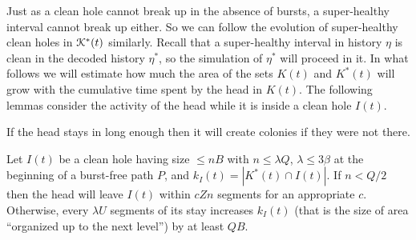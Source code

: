 \documentclass[11pt]{memoir}
\theoremstyle{definition} %
\renewcommand{\le}{\leq}
\def\B{B}
\def\U{U}
\newcommand{\Q}{Q}
\newcommand{\Z}{Z}
\begin{document}
Just as a clean hole cannot break up in the absence of bursts, a super-healthy
interval cannot break up either.
So we can follow the evolution of super-healthy clean holes in \( \mathcal{K}^{*}(t) \) similarly.
Recall that a super-healthy interval in history \( \eta \) is clean in the decoded history \( \eta^{*} \),
so the simulation of \( \eta^{*} \) will proceed in it.
In what follows we will estimate how much the area of the sets \( K(t) \) and \( K^{*}(t) \)
will grow with the cumulative time spent by the head in \( K(t) \).
The following lemmas consider the activity of the head while it is inside a clean hole \( I(t) \).

If the head stays in long enough then it will create colonies if they were not there.

\begin{lemma}\label{lem:inside-hole}
  Let \( I(t) \) be a clean hole having size \( \le n\B \) with \( n\le\lambda\Q \), \( \lambda\le 3\beta \) at the
  beginning of a burst-free path \( P \),
  and \( k_{I}(t)=|K^{*}(t)\cap I(t)| \).
  If \( n<\Q/2 \) then the head will leave \( I(t) \) within \( c\Z n \)
  segments for an appropriate \( c \).
  Otherwise, every \( \lambda\U \) segments of its stay increases
  \( k_{I}(t) \) (that is the size of area ``organized up to the next level'') by at least \( \Q\B \).
\end{lemma}
\end{document}
